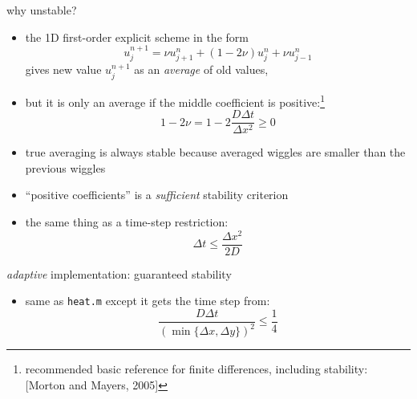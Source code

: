 \begin{frame}{why unstable?}
\label{slide:maxprinc}

\begin{itemize}
\item the 1D first-order explicit scheme in the form 
	$$u_j^{n+1} = \nu u_{j+1}^n + (1 - 2 \nu) u_j^n + \nu u_{j-1}^n$$
gives new value $u_j^{n+1}$ as an \emph{average} of old values,
\item but it is only an average if the middle coefficient is positive:\footnote{recommended basic reference for finite differences, including stability: [Morton and Mayers, 2005]\nocite{MortonMayers}}
	$$1 - 2 \nu = 1 - 2 \frac{D\Delta t}{\Delta x^2} \ge 0$$
\item true averaging is always stable because averaged wiggles are smaller than the previous wiggles
\item ``positive coefficients'' is a \emph{sufficient} stability criterion
\item the same thing as a time-step restriction:
	$$\Delta t \le \frac{\Delta x^2}{2 D}$$
\end{itemize}
\end{frame}


\begin{frame}{\textsl{adaptive} implementation: guaranteed stability}


\small
\begin{itemize}
\item same as \texttt{heat.m} except it gets the time step from:
	$$\frac{D\Delta t}{(\min\{\Delta x,\Delta y\})^2} \le \frac{1}{4}$$
\end{itemize}\end{frame}



